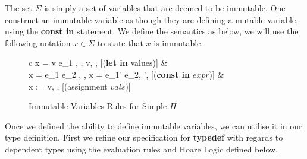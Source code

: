 \documentclass[a4paper,12pt]{report}
\begin{document}
The set $\Sigma$ is simply a set of variables that are deemed to be immutable. 
One construct an immutable variable as though they are defining a mutable 
variable, using the \textbf{const in} statement. We define the semantics as 
below, we will use the following notation $x \in \Sigma$ to state that $x$ is 
immutable.

\begin{figure}[H]
  \begin{center}
    \begin{tabular}{c}
      {\langle {}x = v  e_1 , \sigma, \Sigma \rangle 
      \longrightarrow \langle v, \sigma, \Sigma \rangle} [(\textbf{let in} values)] 
      & \\
      {\langle {}x = e_1  e_2 , \sigma, \Sigma \rangle 
      \longrightarrow \langle {}x = e_1'  e_2, \sigma', \Sigma \rangle} 
      [(\textbf{const in} $expr$)]
      & \\
      {\langle x := v, \sigma \rangle \longrightarrow \langle {}, \sigma[x \mapsto v] \rangle} [(assignment $vals$)] \text{ }
    \end{tabular}
  \end{center}
  \caption{Immutable Variables Rules for Simple-$\Pi$}
\end{figure}

\par
Once we defined the ability to define immutable variables, we can utilise it in 
our type definition. First we refine our specification for \textbf{typedef} 
with regards to dependent types using the evaluation rules and Hoare Logic 
defined below. 
\end{document}
